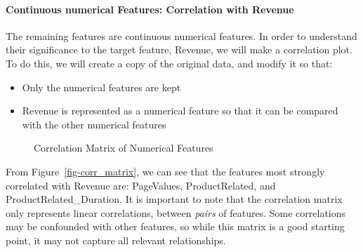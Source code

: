 \documentclass[
  letterpaper,
  DIV=11,
  numbers=noendperiod]{scrartcl}
\let\oldparagraph\paragraph
\renewcommand{\paragraph}[1]{\oldparagraph{#1}\mbox{}}
\begin{document}
\paragraph{Continuous numerical Features: Correlation with
Revenue}\label{continuous-numerical-features-correlation-with-revenue}

The remaining features are continuous numerical features. In order to
understand their significance to the target feature, Revenue, we will
make a correlation plot. To do this, we will create a copy of the
original data, and modify it so that:

\begin{itemize}
\item
  Only the numerical features are kept
\item
  Revenue is represented as a numerical feature so that it can be
  compared with the other numerical features
\end{itemize}

\begin{figure}[H]


\caption{\label{fig-corr\_matrix}Correlation Matrix of Numerical
Features}

\end{figure}%

From Figure~\ref{fig-corr_matrix}, we can see that the features most
strongly correlated with Revenue are: PageValues, ProductRelated, and
ProductRelated\_Duration. It is important to note that the correlation
matrix only represents linear correlations, between \emph{pairs} of
features. Some correlations may be confounded with other features, so
while this matrix is a good starting point, it may not capture all
relevant relationships.
\end{document}
